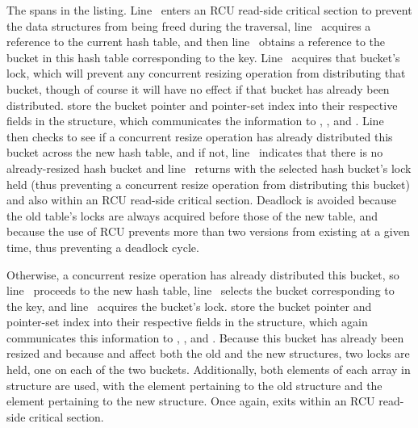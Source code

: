 \begin{fcvref}
The  spans
 in the listing.
Line~ enters an RCU read-side critical section to prevent
the data structures from being freed during the traversal,
line~ acquires a reference to the current hash table, and then
line~ obtains a reference to the bucket in this hash table
corresponding to the key.
Line~ acquires that bucket's lock, which will prevent any concurrent
resizing operation from distributing that bucket, though of course it
will have no effect if that bucket has already been distributed.
 store the bucket pointer and
pointer-set index into their respective fields in the
 structure, which communicates the information to
, , and .
Line~ then checks to see if a concurrent resize
operation has already distributed this bucket across the new hash table,
and if not, line~ indicates that there is no
already-resized hash bucket and
line~ returns with the selected hash bucket's
lock held (thus preventing a concurrent resize operation from distributing
this bucket) and also within an RCU read-side critical section.
Deadlock is avoided because the old table's locks are always acquired
before those of the new table, and because the use of RCU prevents more
than two versions from existing at a given time, thus preventing a
deadlock cycle.

Otherwise, a concurrent resize operation has already distributed this
bucket, so line~ proceeds to the new hash table,
line~ selects the bucket corresponding to the key,
and line~ acquires the bucket's lock.
 store the bucket pointer and
pointer-set index into their respective fields in the
 structure, which again communicates this information to
, , and .
Because this bucket has already been resized and because
 and  affect both the old and the
new  structures, two locks are held, one on each of the
two buckets.
Additionally, both elements of each array in  structure
are used, with the \co{[0]} element pertaining to the old 
structure and the \co{[1]} element pertaining to the new structure.
Once again,  exits within an RCU read-side critical
section.
\end{fcvref}

